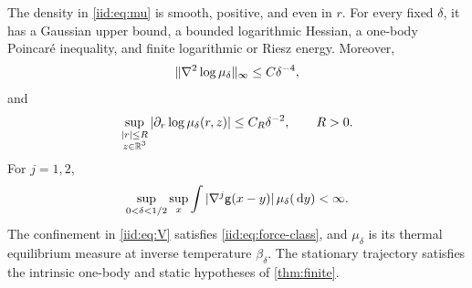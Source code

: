 \documentclass[11pt,reqno]{amsart}
\numberwithin{equation}{section}
\theoremstyle{plain}
\theoremstyle{remark}
\DeclarePairedDelimiter{\norm}{\lVert}{\rVert}
\begin{document}
\begin{lemma}\label{iid:lem:stationary-measure}
The density in \eqref{iid:eq:mu} is smooth, positive, and even in $r$. For every fixed $\delta$, it has a Gaussian upper bound, a bounded logarithmic Hessian, a one-body Poincar\'e inequality, and finite logarithmic or Riesz energy. Moreover,
\begin{equation}\label{iid:eq:score-hessian}
 \norm{\nabla^2\log\mu_\delta}_{\infty}\le C\delta^{-4},
\end{equation}
and
\begin{equation}\label{iid:eq:score-first}
 \sup_{\substack{|r|\le R\\z\in\mathbb R^3}}|\partial_r\log\mu_\delta(r,z)|
 \le C_R\delta^{-2},\qquad R>0.
\end{equation}
For $j=1,2$,
\begin{equation}\label{iid:eq:kernel-row}
 \sup_{0<\delta<1/2}\sup_x\int |\nabla^j\mathsf g(x-y)|\,\mu_\delta(\,\mathrm d y)<\infty.
\end{equation}
The confinement in \eqref{iid:eq:V} satisfies \eqref{iid:eq:force-class}, and $\mu_\delta$ is its thermal equilibrium measure at inverse temperature $\beta_\delta$. The stationary trajectory satisfies the intrinsic one-body and static hypotheses of \cref{thm:finite}.
\end{lemma}
\end{document}
